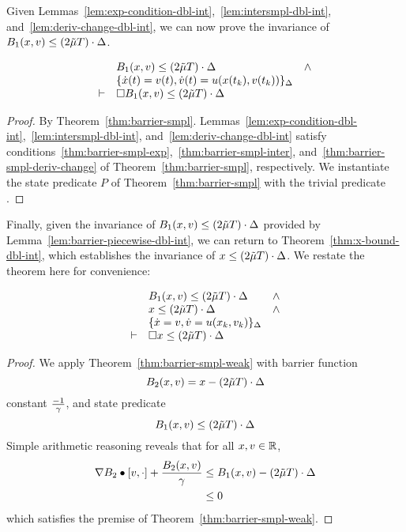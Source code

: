 Given Lemmas~\ref{lem:exp-condition-dbl-int},~\ref{lem:intersmpl-dbl-int},
and~\ref{lem:deriv-change-dbl-int}, we can now prove the invariance of
$B_1 (x,v) \leq (2\tilde{\mu} T) \cdot \Delta$.

\begin{lemma}
\[
\begin{array}{clc}
&
B_1 (x,v) \leq (2\tilde{\mu} T) \cdot \Delta & \wedge \\
& \{\dot{x}(t) = v(t), \dot{v}(t) = u(x(t_k),v(t_k))\}_{\Delta} & \\
\vdash
&
\Box{} B_1 (x,v) \leq (2\tilde{\mu} T) \cdot \Delta &
\end{array}
\]
\label{lem:barrier-piecewise-dbl-int}
\end{lemma}
\begin{proof}
By
Theorem~\ref{thm:barrier-smpl}. Lemmas~\ref{lem:exp-condition-dbl-int},~\ref{lem:intersmpl-dbl-int},
and~\ref{lem:deriv-change-dbl-int} satisfy
conditions~\eqref{thm:barrier-smpl-exp},~\eqref{thm:barrier-smpl-inter},
and~\eqref{thm:barrier-smpl-deriv-change} of
Theorem~\ref{thm:barrier-smpl}, respectively. We instantiate the state
predicate $P$ of Theorem~\ref{thm:barrier-smpl} with the trivial predicate
\True.
\end{proof}

Finally, given the invariance of $B_1 (x,v) \leq (2\tilde{\mu} T) \cdot \Delta$
provided by Lemma~\ref{lem:barrier-piecewise-dbl-int}, we can return to
Theorem~\ref{thm:x-bound-dbl-int}, which establishes the invariance of $x
\leq (2\tilde{\mu} T) \cdot \Delta$. We restate the theorem here for convenience:

\begin{theorem}
\[
\begin{array}{clc}
&
B_1 (x,v) \leq (2\tilde{\mu} T) \cdot \Delta & \wedge \\
&
x \leq (2\tilde{\mu} T) \cdot \Delta & \wedge \\
&
\{\dot{x} = v, \dot{v} = u(x_k,v_k)\}_{\Delta} & \\
\vdash
&
\Box{} x \leq (2\tilde{\mu} T) \cdot \Delta &
\end{array}
\]
\label{thm:x-bound-dbl-int}
\end{theorem}
\begin{proof}
We apply Theorem~\ref{thm:barrier-smpl-weak} with barrier function
\[
B_2 (x,v) = x - (2\tilde{\mu} T)\cdot \Delta\]
constant $\frac{-1}{\gamma}$, and state predicate
\[
B_1 (x,v) \leq (2\tilde{\mu} T) \cdot \Delta
\]
Simple arithmetic reasoning reveals
that for all $x,v \in \mathbb{R}$,
\begin{align}
\nabla B_2 \bullet [v,\cdot] + \frac{B_2 (x,v)}{\gamma} &\leq B_1 (x,v) - (2\tilde{\mu} T)\cdot \Delta \\
&\leq 0
\end{align}
which satisfies the premise of Theorem~\ref{thm:barrier-smpl-weak}.
\end{proof}

